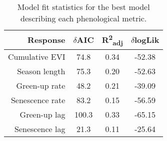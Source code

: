 \begin{table}[H]
\centering
\begin{tabular}{rccc}
  \hline
Response & $\delta$AIC & R\textsuperscript{2}\textsubscript{adj} & $\delta$logLik \\ 
  \hline
Cumulative EVI & 74.8 & 0.34 & -52.38 \\ 
  Season length & 75.3 & 0.20 & -52.63 \\ 
  Green-up rate & 48.2 & 0.21 & -39.09 \\ 
  Senescence rate & 83.2 & 0.15 & -56.59 \\ 
  Green-up lag & 100.3 & 0.33 & -65.15 \\ 
  Senescence lag & 21.3 & 0.11 & -25.64 \\ 
   \hline
\end{tabular}
\caption[Model fit statistics]{Model fit statistics for the best model describing each phenological metric.} 
\label{phen:mod_stat}
\end{table}

